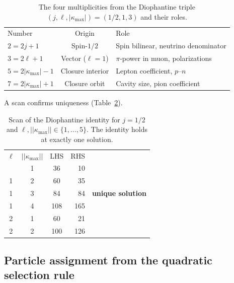 \documentclass[aps,prd,twocolumn,superscriptaddress,nofootinbib,longbibliography]{revtex4-2}
\newcommand{\kmax}{|\kappa_{\mathrm{max}}|}
\begin{document}
\begin{table}[b]
\caption{\label{tab:multiplicities}%
The four multiplicities from the Diophantine triple
$(j, \ell, \kmax) = (1/2, 1, 3)$ and their roles.}
\begin{ruledtabular}
\begin{tabular}{lcl}
Number & Origin & Role \\
\colrule
$2 = 2j+1$ & Spin-$1/2$ & Spin bilinear, neutrino denominator \\
$3 = 2\ell+1$ & Vector ($\ell\!=\!1$) & $\pi$-power in muon, polarizations \\
$5 = 2\kmax-1$ & Closure interior & Lepton coefficient, $p$--$n$ \\
$7 = 2\kmax+1$ & Closure orbit & Cavity size, pion coefficient \\
\end{tabular}
\end{ruledtabular}
\end{table}

A scan confirms uniqueness (Table~\ref{tab:diophantine_scan}).

\begin{table}[h]
\caption{\label{tab:diophantine_scan}%
Scan of the Diophantine identity for $j=1/2$ and
$\ell, |\kmax| \in \{1,\ldots,5\}$.  The identity holds at exactly
one solution.}
\begin{ruledtabular}
\begin{tabular}{cccrl}
$\ell$ & $|\kmax|$ & LHS & RHS & \\
\colrule
1 & 1 & 36 & 10 & \\
1 & 2 & 60 & 35 & \\
1 & 3 & 84 & 84 & \textbf{unique solution} \\
1 & 4 & 108 & 165 & \\
2 & 1 & 60 & 21 & \\
2 & 2 & 100 & 126 & \\
\end{tabular}
\end{ruledtabular}
\end{table}

\subsection{Particle assignment from the quadratic selection rule}
\end{document}
